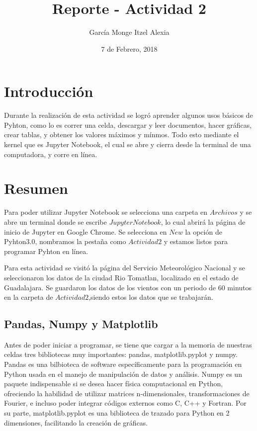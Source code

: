 \documentclass{article}
\title{Reporte - Actividad 2}
\author{García Monge Itzel Alexia}
\date{7 de Febrero, 2018}
\begin{document}
\maketitle

\section{Introducción}
Durante la realización de esta actividad se logró aprender algunos usos básicos de Pyhton, como lo es correr una celda, descargar y leer documentos, hacer gráficas, crear tablas, y obtener los valores máximos y mínmos. Todo esto mediante el kernel que es Jupyter Notebook, el cual se abre y cierra desde la terminal de una computadora, y corre en línea.

\section{Resumen}
Para poder utilizar Jupyter Notebook se selecciona una carpeta en $Archivos$ y se abre un terminal donde se escribe $Jupyter Notebook$, lo cual abrirá la página de inicio de Jupyter en Google Chrome. Se selecciona en $New$ la opción de Pyhton3.0, nombramos la pestaña como $Actividad2$ y estamos listos para programar Pyhton en línea.
	
	Para esta actividad se visitó la página del Servicio Meteorológico Nacional y se seleccionaron los datos de la ciudad Rio Tomatlan, localizado en el estado de Guadalajara. Se guardaron los datos de los vientos con un periodo de 60 minutos en la carpeta de $Actividad2$,siendo estos los datos que se trabajarán.
    
\subsection{Pandas, Numpy y Matplotlib}
Antes de poder iniciar a programar, se tiene que cargar a la memoria de nuestras celdas tres bibliotecas muy importantes: pandas, matplotlib.pyplot y numpy. Pandas es una bilbioteca de software específicamente para la programación en Python usada en el manejo de manipulación de datos y análisis. Numpy es un paquete indispensable si se desea hacer física computacional en Python, ofreciendo la habilidad de utilizar matrices n-dimensionales, transformaciones de Fourier, e incluso poder integrar códigos externos como C, C++ y Fortran. Por su parte, matplotlib.pyplot es una biblioteca de trazado para Python en 2 dimensiones, facilitando la creación de gráficas. 
    
\end{document}

